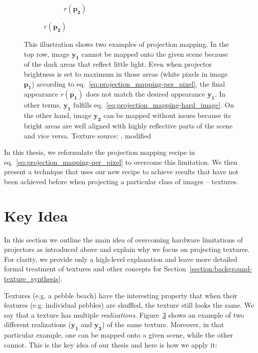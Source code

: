 \begin{figure}[ht]
\begin{subfigure}{\textwidth}
\begin{subfigure}{0.2\textwidth}
            \caption*{\(r(\bm{p_2})\)}
            \label{fig:intro_pixels_vs_stats-stats_proj}
        \end{subfigure}
    \end{subfigure}
    \caption{This illustration shows two examples of projection mapping. In the top row, image \(\bm{y_1}\) cannot be mapped onto the given scene because of the dark areas that reflect little light. Even when projector brightness is set to maximum in those areas (white pixels in image \(\bm{p_1}\)) according to eq.~\ref{eq:projection_mapping-per_pixel}, the final appearance \(r(\bm{p_1})\) does not match the desired appearance \(\bm{y_1}\). In other terms, \(\bm{y_1}\) fulfills eq.~\ref{eq:projection_mapping-hard_image}. On the other hand, image \(\bm{y_2}\) can be mapped without issues because its bright areas are well aligned with highly reflective parts of the scene and vice versa. Texture source: \citet{Gatys2015}, modified}
    \label{fig:intro_pixels_vs_stats}
\end{figure}

In this thesis, we reformulate the projection mapping recipe in eq.~\ref{eq:projection_mapping-per_pixel} to overcome this limitation. We then present a technique that uses our new recipe to achieve results that have not been achieved before when projecting a particular class of images -- textures.

\section{Key Idea}
\label{section:intro-key_idea}

In this section we outline the main idea of overcoming hardware limitations of projectors as introduced above and explain why we focus on projecting textures. For clarity, we provide only a high-level explanation and leave more detailed formal treatment of textures and other concepts for Section~\ref{section:background-texture_synthesis}.

Textures (e.g. a pebble beach) have the interesting property that when their features (e.g. individual pebbles) are shuffled, the texture still looks the same. We say that a texture has multiple \textit{realizations}. Figure~\ref{fig:intro_pixels_vs_stats} shows an example of two different realizations (\(\bm{y_1}\) and \(\bm{y_2}\)) of the same texture. Moreover, in that particular example, one can be mapped onto a given scene, while the other cannot. This is the key idea of our thesis and here is how we apply it:

